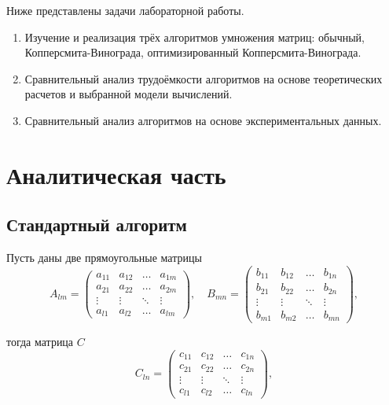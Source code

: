 \documentclass[12pt]{report}
\begin{document}
Ниже представлены задачи лабораторной работы.

\begin{enumerate}
	\item Изучение и реализация трёх алгоритмов умножения матриц: обычный, Копперсмита-Винограда, оптимизированный Копперсмита-Винограда.
	\item Сравнительный анализ трудоёмкости алгоритмов на основе теоретических расчетов и выбранной модели вычислений.
	\item Сравнительный анализ алгоритмов на основе экспериментальных данных.
\end{enumerate}

\chapter{Аналитическая часть}
\section{Стандартный алгоритм}

Пусть даны две прямоугольные матрицы
\begin{equation}
	A_{lm} = \begin{pmatrix}
		a_{11} & a_{12} & \ldots & a_{1m}\\
		a_{21} & a_{22} & \ldots & a_{2m}\\
		\vdots & \vdots & \ddots & \vdots\\
		a_{l1} & a_{l2} & \ldots & a_{lm}
	\end{pmatrix},
	\quad
		B_{mn} = \begin{pmatrix}
		b_{11} & b_{12} & \ldots & b_{1n}\\
		b_{21} & b_{22} & \ldots & b_{2n}\\
		\vdots & \vdots & \ddots & \vdots\\
		b_{m1} & b_{m2} & \ldots & b_{mn}
	\end{pmatrix},
\end{equation}

тогда матрица $C$
\begin{equation}
	C_{ln} = \begin{pmatrix}
		c_{11} & c_{12} & \ldots & c_{1n}\\
		c_{21} & c_{22} & \ldots & c_{2n}\\
		\vdots & \vdots & \ddots & \vdots\\
		c_{l1} & c_{l2} & \ldots & c_{ln}
	\end{pmatrix},
\end{equation}
\end{document}
